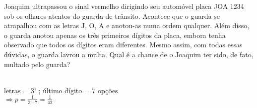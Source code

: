 \begin{ex}
 Joaquim ultrapassou o sinal vermelho dirigindo seu automóvel placa JOA 1234 sob os olhares atentos do guarda de trânsito. Acontece que o guarda se atrapalhou com as letras J, O, A e anotou-as numa ordem qualquer. Além disso, o guarda anotou apenas os três primeiros dígitos da placa, embora tenha observado que todos os dígitos eram diferentes. Mesmo assim, com todas essas dúvidas, o guarda lavrou a multa. Qual é a chance de o Joaquim ter sido, de fato, multado pelo guarda?
   \begin{sol}
     \phantom{A} \\
     letras = 3!   ; último dígito = 7 opções \\
     $\Longrightarrow p=\frac{1}{3!\cdot7}=\frac{1}{42}$
   \end{sol}
\end{ex}